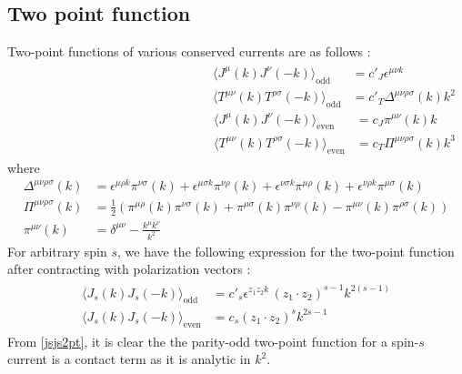 \documentclass[a4paper,11pt]{article}
\begin{document}
\subsection{Two point function}
Two-point functions of various conserved currents are as follows :
\begin{align}
\begin{split}
    \langle J^{\mu}(k)J^{\nu}(-k) \rangle_{\text{odd}} &= c'_J \epsilon^{\mu\nu k}\\[5 pt]
    \langle T^{\mu\nu}(k)T^{\rho\sigma}(-k) \rangle_{\text{odd}} &= c'_T \Delta^{\mu\nu\rho\sigma}(k)k^2
    \end{split}
    \begin{split}
         \langle J^{\mu}(k)J^{\nu}(-k) \rangle_{\text{even}} &= c_J \pi^{\mu\nu}(k)k\\[5 pt]
          \langle T^{\mu\nu}(k)T^{\rho\sigma}(-k) \rangle_{\text{even}} &= c_T\Pi^{\mu\nu\rho\sigma}(k)k^3
    \end{split}
\end{align}
where 
\begin{align}
    \Delta^{\mu \nu \rho \sigma}(k)&=\epsilon^{\mu \rho k} \pi^{\nu \sigma}(k)+\epsilon^{\mu \sigma k} \pi^{\nu \rho}(k)+\epsilon^{\nu \sigma k} \pi^{\mu \rho}(k)+\epsilon^{\nu \rho k} \pi^{\mu \sigma}(k)\\[5 pt]
    \Pi^{\mu\nu\rho\sigma}(k) &= \frac{1}{2}\left(\pi^{\mu\rho}(k)\pi^{\nu\sigma}(k)+\pi^{\mu\sigma}(k)\pi^{\nu\rho}(k)-\pi^{\mu\nu}(k)\pi^{\rho\sigma}(k)\right)\\[5 pt]
    \pi^{\mu\nu}(k) &= \delta^{\mu\nu}-\frac{k^{\mu}k^{\nu}}{k^2}
\end{align}
For arbitrary spin $s$, we have the following expression for the two-point function after contracting with polarization vectors :
\begin{align}\label{jsjs2pt}
\begin{split}
    \langle J_s(k)J_s(-k) \rangle_{\text{odd}} &= c'_s\epsilon^{z_1 z_2 k}\,(z_1 \cdot z_2)^{s-1}k^{2(s-1)}\\[5 pt]
        \langle J_s(k)J_s(-k) \rangle_{\text{even}} &= c_s (z_1 \cdot z_2)^s k^{2s-1}
    \end{split}
\end{align}
From \eqref{jsjs2pt}, it is clear the the parity-odd two-point function for a spin-$s$ current is a contact term as it is analytic in $k^2$.
\end{document}
